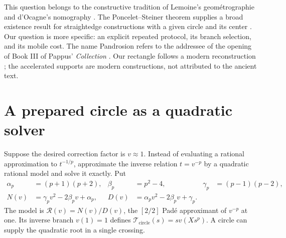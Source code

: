 \documentclass[11pt,a4paper]{article}
\newcommand{\map}[1]{\mathcal T_{\mathrm{#1}}}
\begin{document}
This question belongs to the constructive tradition of Lemoine's geom\'etrographie and d'Ocagne's nomography \cite{lemoine1902,docagne1925}. The Poncelet--Steiner theorem supplies a broad existence result for straightedge constructions with a given circle and its center \cite{steiner1833}. Our question is more specific: an explicit repeated protocol, its branch selection, and its mobile cost. The name Pandrosion refers to the addressee of the opening of Book III of Pappus' \emph{Collection} \cite{pappusLittle2023}. Our rectangle follows a modern reconstruction \cite{launayPandrosion}; the accelerated supports are modern constructions, not attributed to the ancient text.

\section{A prepared circle as a quadratic solver}\label{sec:circle}
Suppose the desired correction factor is $v\approx1$. Instead of evaluating a rational approximation to $t^{-1/p}$, approximate the inverse relation $t=v^{-p}$ by a quadratic rational model and solve it exactly. Put
\begin{align}
 \alpha_p&=(p+1)(p+2),&\beta_p&=p^2-4,&\gamma_p&=(p-1)(p-2),\nonumber\\
 N(v)&=\gamma_pv^2-2\beta_pv+\alpha_p,&
 D(v)&=\alpha_pv^2-2\beta_pv+\gamma_p.\label{eq:model}
\end{align}
The model is $\mathcal R(v)=N(v)/D(v)$, the $[2/2]$ Pad\'e approximant of $v^{-p}$ at one. Its inverse branch $v(1)=1$ defines $\map{circle}(s)=sv(Xs^p)$. A circle can supply the quadratic root in a single crossing.
\end{document}

